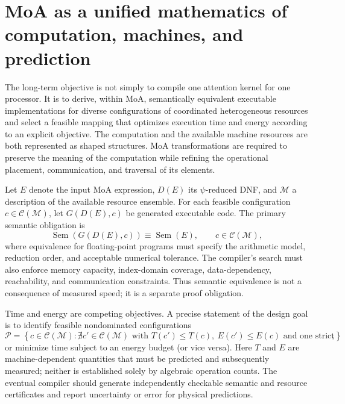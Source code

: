 \documentclass[11pt]{article}
\begin{document}
\section{MoA as a unified mathematics of computation, machines, and prediction}
The long-term objective is not simply to compile one attention kernel for one processor. It is to derive, within MoA, semantically equivalent executable implementations for diverse configurations of coordinated heterogeneous resources and select a feasible mapping that optimizes execution time and energy according to an explicit objective. The computation and the available machine resources are both represented as shaped structures. MoA transformations are required to preserve the meaning of the computation while refining the operational placement, communication, and traversal of its elements.

Let $E$ denote the input MoA expression, $D(E)$ its $\psi$-reduced DNF, and $\mathcal{M}$ a description of the available resource ensemble. For each feasible configuration $c\in\mathcal{C}(\mathcal{M})$, let $G(D(E),c)$ be generated executable code. The primary semantic obligation is
\begin{equation}
\operatorname{Sem}(G(D(E),c))\equiv\operatorname{Sem}(E),\qquad c\in\mathcal{C}(\mathcal{M}),
\end{equation}
where equivalence for floating-point programs must specify the arithmetic model, reduction order, and acceptable numerical tolerance. The compiler's search must also enforce memory capacity, index-domain coverage, data-dependency, reachability, and communication constraints. Thus semantic equivalence is not a consequence of measured speed; it is a separate proof obligation.

Time and energy are competing objectives. A precise statement of the design goal is to identify feasible nondominated configurations
\begin{equation}
\mathcal{P}=\left\{c\in\mathcal{C}(\mathcal{M}):\nexists c'\in\mathcal{C}(\mathcal{M})\text{ with }T(c')\le T(c),\ E(c')\le E(c)\text{ and one strict}\right\},
\end{equation}
or minimize time subject to an energy budget (or vice versa). Here $T$ and $E$ are machine-dependent quantities that must be predicted and subsequently measured; neither is established solely by algebraic operation counts. The eventual compiler should generate independently checkable semantic and resource certificates and report uncertainty or error for physical predictions.
\end{document}
